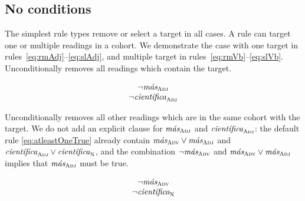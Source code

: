 


\subsection{No conditions} 

The simplest rule types remove or select a target in all cases. 
A rule can target one or multiple readings in a cohort. We demonstrate the case with one target in rules~\ref{eq:rmAdj}--\ref{eq:slAdj}, and multiple target in rules~\ref{eq:rmVb}--\ref{eq:slVb}. \\


 Unconditionally removes all readings which contain the target.

\begin{equation}
\begin{array}{c}
\neg{}\masAdj \\
\neg{}\cientificaAdj
\end{array}
\label{eq:rmAdj}
\end{equation}

 Unconditionally removes all other readings which are in the same cohort with the target.
We do not add an explicit clause for $\text{\em m\'{a}s}_{\text{\sc Adj}}$ and $\cientificaAdj$: the default rule \ref{eq:atleastOneTrue} already contain $\text{\em m\'{a}s}_{\text{\sc Adv}} \vee \text{\em m\'{a}s}_{\text{\sc Adj}}$ and $\cientificaAdj \vee \cientificaN$, and the combination $\neg\text{\em m\'{a}s}_{\text{\sc Adv}}$  and $\text{\em m\'{a}s}_{\text{\sc Adv}} \vee \text{\em m\'{a}s}_{\text{\sc Adj}}$  implies that $\text{\em m\'{a}s}_{\text{\sc Adj}}$ must be true. 

\begin{equation}
\begin{array}{c}
\neg{}\masAdv \\
\neg{}\cientificaN
\end{array}
\label{eq:slAdj}
\end{equation}

